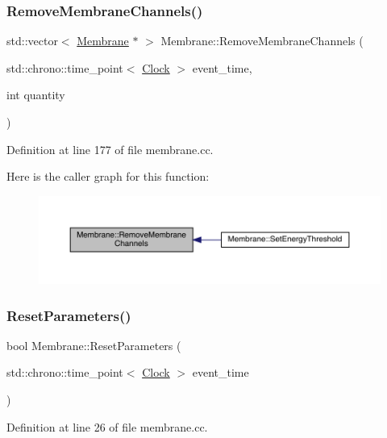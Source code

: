\subsubsection{\texorpdfstring{Remove\+Membrane\+Channels()}{RemoveMembraneChannels()}}
{\footnotesize\ttfamily std\+::vector$<$ \hyperlink{class_membrane}{Membrane} $\ast$ $>$ Membrane\+::\+Remove\+Membrane\+Channels (\begin{DoxyParamCaption}\item[{std\+::chrono\+::time\+\_\+point$<$ \hyperlink{universe_8h_a0ef8d951d1ca5ab3cfaf7ab4c7a6fd80}{Clock} $>$}]{event\+\_\+time,  }\item[{int}]{quantity }\end{DoxyParamCaption})}



Definition at line 177 of file membrane.\+cc.

Here is the caller graph for this function\+:
\nopagebreak
\begin{figure}[H]
\begin{center}
\leavevmode
\includegraphics[width=350pt]{class_membrane_ac33ffd86416112420dc5b0576287c44d_icgraph}
\end{center}
\end{figure}
\mbox{\label{class_membrane_a9c49462cf63495381a52e2defc80b1e4}} 
\subsubsection{\texorpdfstring{Reset\+Parameters()}{ResetParameters()}}
{\footnotesize\ttfamily bool Membrane\+::\+Reset\+Parameters (\begin{DoxyParamCaption}\item[{std\+::chrono\+::time\+\_\+point$<$ \hyperlink{universe_8h_a0ef8d951d1ca5ab3cfaf7ab4c7a6fd80}{Clock} $>$}]{event\+\_\+time }\end{DoxyParamCaption})}



Definition at line 26 of file membrane.\+cc.

